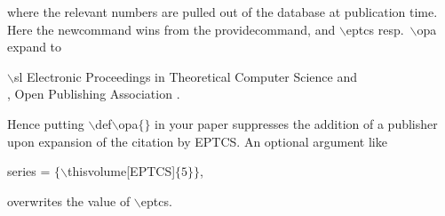 \documentclass[submission,copyright,creativecommons]{eptcs}
\begin{document}
\noindent
where the relevant numbers are pulled out of the database at publication time.
Here the newcommand wins from the providecommand, and {\ttfamily \small $\backslash$eptcs}
resp.\ {\ttfamily \small $\backslash$opa} expand to

\noindent
{\small \ttfamily $\backslash$sl Electronic Proceedings in Theoretical Computer Science} \hfill and\\
{\small \ttfamily , Open Publishing Association} \hfill .

\noindent
Hence putting {\small \ttfamily $\backslash$def$\backslash$opa$\{\}$} in
your paper suppresses the addition of a publisher upon expansion of the citation by EPTCS\@.
An optional argument like
\begin{center}
  {\ttfamily series    = $\{\backslash$thisvolume[EPTCS]$\{5\}\}$},
\end{center}
overwrites the value of {\ttfamily \small $\backslash$eptcs}.

\nocite{*}


\end{document}
